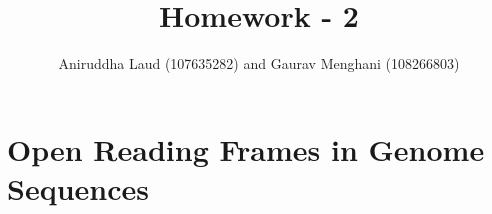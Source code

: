 \documentclass{article}
\title{Homework - 2}
\author{Aniruddha Laud (107635282) and Gaurav Menghani (108266803)}
\begin{document}
\maketitle

\clearpage

\tableofcontents

\section{Open Reading Frames in Genome Sequences}
\end{document}
